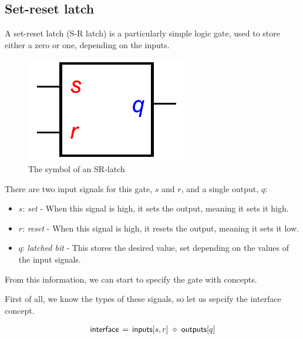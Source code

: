 \documentclass[british, journal]{IEEEtran}
\begin{document}
\subsection{Set-reset latch \label{sub:srlatch}}

A set-reset latch (S-R latch) is a particularly simple logic gate, used to store either a zero or one,
depending on the inputs. 

\vspace{-3mm}

\begin{figure}[h]
\begin{centering}
\includegraphics[scale=0.51]{Images/sr-latch-circuit}
\par\end{centering}
\vspace{-1mm}
\protect\caption{\label{fig:sr-latch-circuit} The symbol of an SR-latch}
\vspace{-3mm}
\end{figure}

\noindent There are two input signals for this gate, $s$ and $r$, and a single output, $q$: 

\begin{itemize}
  \item $s$: \emph{set} - When this signal is high, it sets the output, meaning it sets it high.
  \item $r$: \emph{reset} - When this signal is high, it resets the output, meaning it sets it low.
  \item $q$: \emph{latched bit} - This stores the desired value, set depending on the values of the input signals.
\end{itemize}

\noindent From this information, we can start to specify the gate with concepts.

First of all, we know the types of these signals, so let us sepcify the interface concept.

\[
\begin{array}{lcl}
\mathsf{interface}&\hspace{-2mm}=&\hspace{-2mm}\mathsf{inputs}[s, r]~\diamond~\mathsf{outputs}[q]
\end{array}
\]
\end{document}

